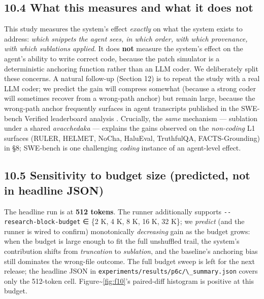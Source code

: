 \begin{table}[!tbp]
\centering
\caption{\textbf{T5 --- P6-C per-(model, seed) breakdown.} Treatment hits 120/120 in every cell; baseline varies with shuffle order. Source: \texttt{experiments/results/p6c/swebench\_ab.json}.}
\label{tab:t5_p6c_per_seed}
{\scriptsize\setlength{\tabcolsep}{3pt}%
}
\end{table}

\subsection{10.4 What this measures and what it does not}\label{what-this-measures-and-what-it-does-not}

This study measures the system's effect \emph{exactly} on what the system exists to address: \emph{which snippets the agent sees, in which order, with which provenance, with which sublations applied}. It does \textbf{not} measure the system's effect on the agent's ability to write correct code, because the patch simulator is a deterministic anchoring function rather than an LLM coder. We deliberately split these concerns. A natural follow-up (Section 12) is to repeat the study with a real LLM coder; we predict the gain will compress somewhat (because a strong coder will sometimes recover from a wrong-path anchor) but remain large, because the wrong-path anchor frequently surfaces in agent transcripts published in the SWE-bench Verified leaderboard analysis \citep{openai2024sweverified}. Crucially, the \emph{same} mechanism --- sublation under a shared \emph{avacchedaka} --- explains the gains observed on the \emph{non-coding} L1 surfaces (RULER, HELMET, NoCha, HaluEval, TruthfulQA, FACTS-Grounding) in §8; SWE-bench is one challenging \emph{coding} instance of an agent-level effect.

\subsection{10.5 Sensitivity to budget size (predicted, not in headline JSON)}\label{sensitivity-to-budget-size-predicted-not-in-headline-json}

The headline run is at \textbf{512 tokens}. The runner additionally supports \passthrough{\lstinline!--research-block-budget!} ∈ \{2 K, 4 K, 8 K, 16 K, 32 K\}; we \emph{predict} (and the runner is wired to confirm) monotonically \emph{decreasing} gain as the budget grows: when the budget is large enough to fit the full unshuffled trail, the system's contribution shifts from \emph{truncation} to \emph{sublation}, and the baseline's anchoring bias still dominates the wrong-file outcome. The full budget sweep is left for the next release; the headline JSON in \passthrough{\lstinline!experiments/results/p6c/\_summary.json!} covers only the 512-token cell. Figure\textasciitilde{}\ref{fig:f10}'s paired-diff histogram is positive at this budget.

